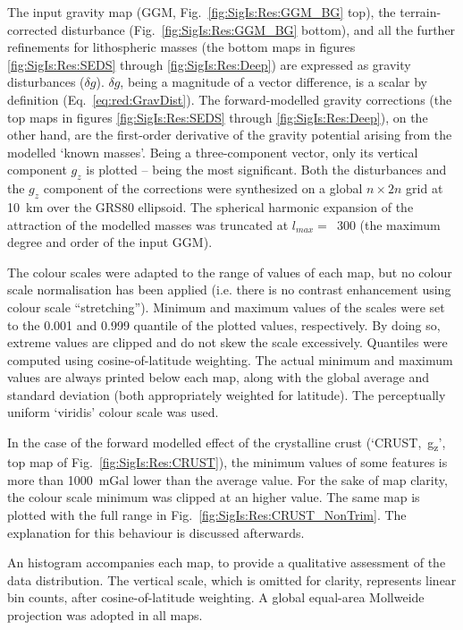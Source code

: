 The input gravity map ({GGM}, Fig.~\ref{fig:SigIs:Res:GGM_BG} top), the terrain-corrected disturbance (Fig.~\ref{fig:SigIs:Res:GGM_BG} bottom), and all the further refinements for lithospheric masses (the bottom maps in figures \ref{fig:SigIs:Res:SEDS} through \ref{fig:SigIs:Res:Deep}) are expressed as gravity disturbances ($\delta g$).
$\delta g$, being a magnitude of a vector difference, is a scalar by definition (Eq.~\ref{eq:red:GravDist}).
The forward-modelled gravity corrections (the top maps in figures \ref{fig:SigIs:Res:SEDS} through \ref{fig:SigIs:Res:Deep}), on the other hand, are the first-order derivative of the gravity potential arising from the modelled `known masses'.
Being a three-component vector, only its vertical component $g_z$ is plotted -- being the most significant.
Both the disturbances and the $g_z$ component of the corrections were synthesized on a global $n \times 2n$ grid at \SI{10}{\kilo \metre} over the {GRS80} ellipsoid.
The spherical harmonic expansion of the attraction of the modelled masses was truncated at $l_{max} =$~\num{300} (the maximum degree and order of the input {GGM}).

The colour scales were adapted to the range of values of each map, but no colour scale normalisation has been applied (i.e. there is no contrast enhancement using colour scale ``stretching'').
Minimum and maximum values of the scales were set to the \num{0.001} and \num{0.999} quantile of the plotted values, respectively.
By doing so, extreme values are clipped and do not skew the scale excessively.
Quantiles were computed using cosine-of-latitude weighting.
The actual minimum and maximum values are always printed below each map, along with the global average and standard deviation (both appropriately weighted for latitude).
The perceptually uniform `viridis' colour scale \parencite{Smith2015} was used.

In the case of the forward modelled effect of the crystalline crust (`CRUST,~g\textsubscript{z}', top map of Fig.~\ref{fig:SigIs:Res:CRUST}), the minimum values of some features is more than \SI{1000}{mGal} lower than the average value.
For the sake of map clarity, the colour scale minimum was clipped at an higher value.
The same map is plotted with the full range in Fig.~\ref{fig:SigIs:Res:CRUST_NonTrim}.
The explanation for this behaviour is discussed afterwards.

An histogram accompanies each map, to provide a qualitative assessment of the data distribution.
The vertical scale, which is omitted for clarity, represents linear bin counts, after cosine-of-latitude weighting.
A global equal-area Mollweide projection was adopted in all maps.

